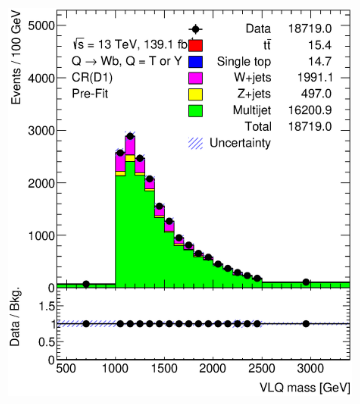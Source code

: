 \begin{figure}[hbt!]
\begin{subfigure}{.35\textwidth}
		\caption{}
		\label{fig:app:cr_d1:jet_pt}
	\end{subfigure}
	\begin{subfigure}{.35\textwidth}
		\centering
		\includegraphics[width=\linewidth,height=\textheight,keepaspectratio]{CR_D1_VLQM.eps}
		\caption{}
		\label{fig:app:cr_d1:VLQM}
	\end{subfigure}\hspace{0.6cm}
	\begin{subfigure}{.35\textwidth}
		\centering

\end{subfigure}
\end{figure}
